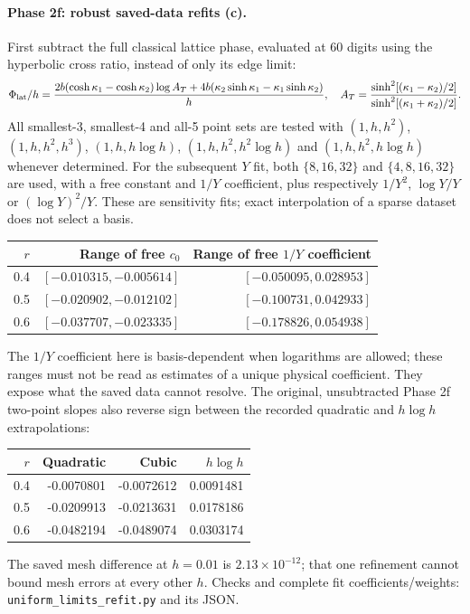 \documentclass[11pt,a4paper]{article}
\newcommand{\scr}[1]{\texttt{uniform\_\allowbreak limits\_\allowbreak #1.py}}
\begin{document}
\paragraph{Phase 2f: robust saved-data refits (c).}
First subtract the full classical lattice phase, evaluated at 60 digits using
the hyperbolic cross ratio, instead of only its edge limit:
\begin{equation}
 \Phi_{\rm lat}/h=\frac{2b(\cosh\kappa_1-\cosh\kappa_2)\log A_T
       +4b(\kappa_2\sinh\kappa_1-\kappa_1\sinh\kappa_2)}h,
 \quad A_T=\frac{\sinh^2[(\kappa_1-\kappa_2)/2]}
                  {\sinh^2[(\kappa_1+\kappa_2)/2]}.
\end{equation}
All smallest-3, smallest-4 and all-5 point sets are tested with
$(1,h,h^2)$, $(1,h,h^2,h^3)$, $(1,h,h\log h)$,
$(1,h,h^2,h^2\log h)$ and $(1,h,h^2,h\log h)$ whenever determined.
For the subsequent $Y$ fit, both $\{8,16,32\}$ and $\{4,8,16,32\}$ are used,
with a free constant and $1/Y$ coefficient, plus respectively
$1/Y^2$, $\log Y/Y$ or $(\log Y)^2/Y$. These are sensitivity fits;
exact interpolation of a sparse dataset does not select a basis.
\begin{center}\begin{tabular}{rrr}\toprule
$r$ & Range of free $c_0$ & Range of free $1/Y$ coefficient\\\midrule
0.4 & $[-0.010315,-0.005614]$ & $[-0.050095,0.028953]$\\
0.5 & $[-0.020902,-0.012102]$ & $[-0.100731,0.042933]$\\
0.6 & $[-0.037707,-0.023335]$ & $[-0.178826,0.054938]$\\
\bottomrule\end{tabular}\end{center}
The $1/Y$ coefficient here is basis-dependent when logarithms are allowed;
these ranges must not be read as estimates of a unique physical coefficient.
They expose what the saved data cannot resolve. The original, unsubtracted
Phase 2f two-point slopes also reverse sign between the recorded quadratic
and $h\log h$ extrapolations:
\begin{center}\begin{tabular}{rrrr}\toprule
$r$ & Quadratic & Cubic & $h\log h$\\\midrule
0.4 & -0.0070801 & -0.0072612 & 0.0091481\\
0.5 & -0.0209913 & -0.0213631 & 0.0178186\\
0.6 & -0.0482194 & -0.0489074 & 0.0303174\\
\bottomrule\end{tabular}\end{center}
The saved mesh difference at $h=0.01$ is $2.13\times10^{-12}$;
that one refinement cannot bound mesh errors at every other $h$.
Checks and complete fit coefficients/weights: \scr{refit} and its JSON.
\end{document}
